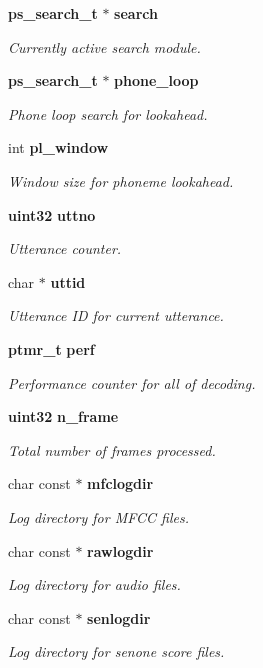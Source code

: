 \begin{DoxyCompactItemize}
{\bf ps\-\_\-search\-\_\-t} $\ast$ {\bf search}
\begin{DoxyCompactList}\small\item\em \-Currently active search module. \end{DoxyCompactList}\item 
{\bf ps\-\_\-search\-\_\-t} $\ast$ {\bf phone\-\_\-loop}
\begin{DoxyCompactList}\small\item\em \-Phone loop search for lookahead. \end{DoxyCompactList}\item 
int {\bf pl\-\_\-window}
\begin{DoxyCompactList}\small\item\em \-Window size for phoneme lookahead. \end{DoxyCompactList}\item 
{\bf uint32} {\bf uttno}
\begin{DoxyCompactList}\small\item\em \-Utterance counter. \end{DoxyCompactList}\item 
char $\ast$ {\bf uttid}
\begin{DoxyCompactList}\small\item\em \-Utterance \-I\-D for current utterance. \end{DoxyCompactList}\item 
{\bf ptmr\-\_\-t} {\bf perf}
\begin{DoxyCompactList}\small\item\em \-Performance counter for all of decoding. \end{DoxyCompactList}\item 
{\bf uint32} {\bf n\-\_\-frame}
\begin{DoxyCompactList}\small\item\em \-Total number of frames processed. \end{DoxyCompactList}\item 
char const $\ast$ {\bf mfclogdir}
\begin{DoxyCompactList}\small\item\em \-Log directory for \-M\-F\-C\-C files. \end{DoxyCompactList}\item 
char const $\ast$ {\bf rawlogdir}
\begin{DoxyCompactList}\small\item\em \-Log directory for audio files. \end{DoxyCompactList}\item 
char const $\ast$ {\bf senlogdir}
\begin{DoxyCompactList}\small\item\em \-Log directory for senone score files. \end{DoxyCompactList}\end{DoxyCompactItemize}


